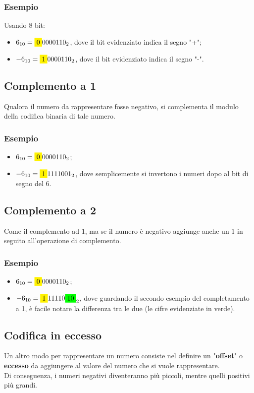 \documentclass[12pt]{article}
\begin{document}
\subsubsection{Esempio}
Usando 8 bit:
\begin{itemize}
    \item $6_{10} = \colorbox{yellow}{0}0000110_2$, dove il bit evidenziato indica il segno "+";
    \item $-6_{10} = \colorbox{yellow}{1}0000110_2$, dove il bit evidenziato indica il segno "-".
\end{itemize}
\subsection{Complemento a 1}
Qualora il numero da rappresentare fosse negativo, si complementa il modulo della codifica binaria di tale numero.
\subsubsection{Esempio}
\begin{itemize}
    \item $6_{10} = \colorbox{yellow}{0}0000110_2$;
    \item $-6_{10} = \colorbox{yellow}{1}1111001_2$, dove semplicemente si invertono i numeri dopo al bit di segno del 6.
\end{itemize}
\subsection{Complemento a 2}
Come il complemento ad 1, ma se il numero è negativo aggiunge anche un 1 in seguito all'operazione di complemento.
\subsubsection{Esempio}
\begin{itemize}
    \item $6_{10} = \colorbox{yellow}{0}0000110_2$;
    \item $-6_{10} = \colorbox{yellow}{1}11110\colorbox{green}{10}_2$, dove guardando il secondo esempio del completamento a 1, è facile notare la differenza tra le due (le cifre evidenziate in verde).
\end{itemize}
\subsection{Codifica in eccesso}
Un altro modo per rappresentare un numero consiste nel definire un "\textbf{offset}" o \textbf{eccesso} da aggiungere al valore del numero che si vuole rappresentare.\\
Di conseguenza, i numeri negativi diventeranno più piccoli, mentre quelli positivi più grandi.
\end{document}
